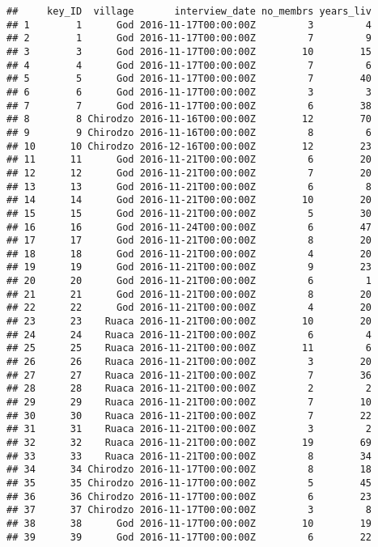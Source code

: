 \documentclass[
]{article}
\begin{document}
\begin{verbatim}
##     key_ID  village       interview_date no_membrs years_liv
## 1        1      God 2016-11-17T00:00:00Z         3         4
## 2        1      God 2016-11-17T00:00:00Z         7         9
## 3        3      God 2016-11-17T00:00:00Z        10        15
## 4        4      God 2016-11-17T00:00:00Z         7         6
## 5        5      God 2016-11-17T00:00:00Z         7        40
## 6        6      God 2016-11-17T00:00:00Z         3         3
## 7        7      God 2016-11-17T00:00:00Z         6        38
## 8        8 Chirodzo 2016-11-16T00:00:00Z        12        70
## 9        9 Chirodzo 2016-11-16T00:00:00Z         8         6
## 10      10 Chirodzo 2016-12-16T00:00:00Z        12        23
## 11      11      God 2016-11-21T00:00:00Z         6        20
## 12      12      God 2016-11-21T00:00:00Z         7        20
## 13      13      God 2016-11-21T00:00:00Z         6         8
## 14      14      God 2016-11-21T00:00:00Z        10        20
## 15      15      God 2016-11-21T00:00:00Z         5        30
## 16      16      God 2016-11-24T00:00:00Z         6        47
## 17      17      God 2016-11-21T00:00:00Z         8        20
## 18      18      God 2016-11-21T00:00:00Z         4        20
## 19      19      God 2016-11-21T00:00:00Z         9        23
## 20      20      God 2016-11-21T00:00:00Z         6         1
## 21      21      God 2016-11-21T00:00:00Z         8        20
## 22      22      God 2016-11-21T00:00:00Z         4        20
## 23      23    Ruaca 2016-11-21T00:00:00Z        10        20
## 24      24    Ruaca 2016-11-21T00:00:00Z         6         4
## 25      25    Ruaca 2016-11-21T00:00:00Z        11         6
## 26      26    Ruaca 2016-11-21T00:00:00Z         3        20
## 27      27    Ruaca 2016-11-21T00:00:00Z         7        36
## 28      28    Ruaca 2016-11-21T00:00:00Z         2         2
## 29      29    Ruaca 2016-11-21T00:00:00Z         7        10
## 30      30    Ruaca 2016-11-21T00:00:00Z         7        22
## 31      31    Ruaca 2016-11-21T00:00:00Z         3         2
## 32      32    Ruaca 2016-11-21T00:00:00Z        19        69
## 33      33    Ruaca 2016-11-21T00:00:00Z         8        34
## 34      34 Chirodzo 2016-11-17T00:00:00Z         8        18
## 35      35 Chirodzo 2016-11-17T00:00:00Z         5        45
## 36      36 Chirodzo 2016-11-17T00:00:00Z         6        23
## 37      37 Chirodzo 2016-11-17T00:00:00Z         3         8
## 38      38      God 2016-11-17T00:00:00Z        10        19
## 39      39      God 2016-11-17T00:00:00Z         6        22

\end{verbatim}
\end{document}
